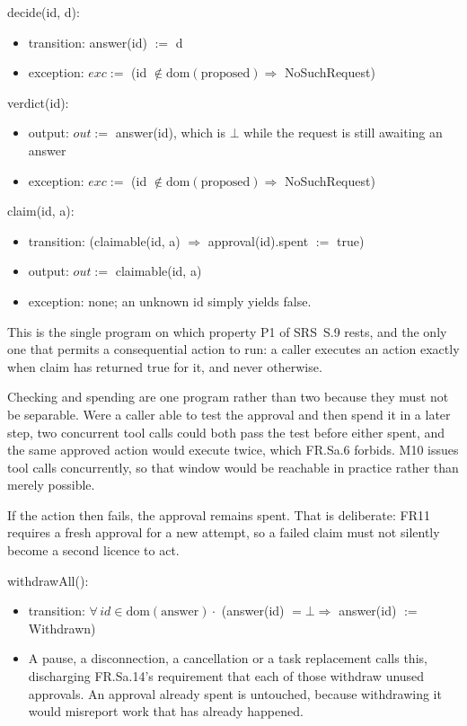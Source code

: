 \documentclass[12pt, titlepage]{article}
\newcommand{\nil}{\bot}
\begin{document}
\noindent decide(id, d):
\begin{itemize}
\item transition: answer(id) $:=$ d
\item exception: $exc :=$ (id $\notin \mathrm{dom}(\text{proposed}) \Rightarrow$
NoSuchRequest)
\end{itemize}

\noindent verdict(id):
\begin{itemize}
\item output: $out :=$ answer(id), which is $\nil$ while the request is still
awaiting an answer
\item exception: $exc :=$ (id $\notin \mathrm{dom}(\text{proposed}) \Rightarrow$
NoSuchRequest)
\end{itemize}

\noindent claim(id, a):
\begin{itemize}
\item transition: (claimable(id, a) $\Rightarrow$ approval(id).spent $:=$ true)
\item output: $out :=$ claimable(id, a)
\item exception: none; an unknown id simply yields false.
\end{itemize}

\noindent This is the single program on which property P1 of SRS~S.9 rests, and
the only one that permits a consequential action to run: a caller executes an
action exactly when claim has returned true for it, and never otherwise.

\noindent Checking and spending are one program rather than two because they
must not be separable. Were a caller able to test the approval and then spend it
in a later step, two concurrent tool calls could both pass the test before
either spent, and the same approved action would execute twice, which FR.Sa.6
forbids. M10 issues tool calls concurrently, so that window would be reachable
in practice rather than merely possible.

\noindent If the action then fails, the approval remains spent. That is
deliberate: FR11 requires a fresh approval for a new attempt, so a failed claim
must not silently become a second licence to act.

\noindent withdrawAll():
\begin{itemize}
\item transition: $\forall\, id \in \mathrm{dom}(\text{answer}) \cdot$
(answer(id) $= \nil \Rightarrow$ answer(id) $:=$ Withdrawn)
\item A pause, a disconnection, a cancellation or a task replacement calls this,
discharging FR.Sa.14's requirement that each of those withdraw unused
approvals. An approval already spent is untouched, because withdrawing it would
misreport work that has already happened.
\end{itemize}
\end{document}
